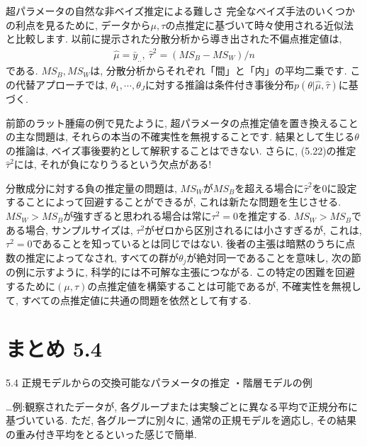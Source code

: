 \documentclass[10pt,dvipdfmx,a4]{beamer}
\newcommand{\eq}[1]{\begin{align}#1\end{align}}
\begin{document}

\begin{frame}{超パラメータの自然な非ベイズ推定による難しさ}
完全なベイズ手法のいくつかの利点を見るために, データから$\mu,\tau$の点推定に基づいて時々使用される近似法と比較します.
以前に提示された分散分析から導き出された不偏点推定値は,
\eq{\hat{\mu}=\bar{y}_{..},\ \hat{\tau}^2=(MS_B-MS_W)/n}
である.
$MS_B, MS_W$は, 分散分析からそれぞれ「間」と「内」の平均二乗です.
この代替アプローチでは, $\theta_1,\cdots,\theta_J$に対する推論は条件付き事後分布$p(\theta|\hat{\mu},\hat{\tau})$に基づく.

前節のラット腫瘍の例で見たように, 超パラメータの点推定値を置き換えることの主な問題は, それらの本当の不確実性を無視することです.
結果として生じる$\theta$の推論は, ベイズ事後要約として解釈することはできない.
さらに, (5.22)の推定$\hat{\tau}^2$には, それが負になりうるという欠点がある!
\end{frame}


\begin{frame}
分散成分に対する負の推定量の問題は, $MS_W$が$MS_B$を超える場合に$\hat{\tau}^2$を0に設定することによって回避することができるが, これは新たな問題を生じさせる.
$MS_W>MS_B$が強すぎると思われる場合は常に$\tau^2 =0$を推定する.
$MS_W>MS_B$である場合, サンプルサイズは, $\tau^2$がゼロから区別されるには小さすぎるが, これは, $\tau^2=0$であることを知っているとは同じではない.
後者の主張は暗黙のうちに点数の推定によってなされ, すべての群が$\theta_j$が絶対同一であることを意味し, 次の節の例に示すように, 科学的には不可解な主張につながる.
この特定の困難を回避するために$(\mu,\tau)$の点推定値を構築することは可能であるが, 不確実性を無視して, すべての点推定値に共通の問題を依然として有する.
\end{frame}


\section{まとめ 5.4}
\begin{frame}[t]{5.4 正規モデルからの交換可能なパラメータの推定}
・階層モデルの例

…例:観察されたデータが, 各グループまたは実験ごとに異なる平均で正規分布に基づいている.
ただ, 各グループに別々に, 通常の正規モデルを適応し, その結果の重み付き平均をとるといった感じで簡単.

\end{frame}
\end{document}
